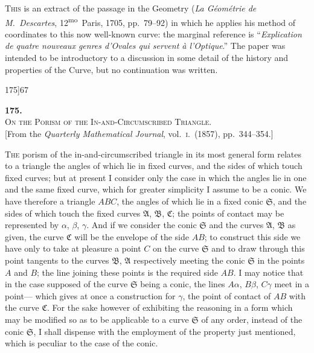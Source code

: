 \documentclass[11pt]{article}
\begin{document}
\bigskip

\textsc{This} is an extract of the passage in the Geometry (\textit{La G\'eom\'etrie de M.\ Descartes}, 12\textsuperscript{mo}\ Paris, 1705,
pp.~79--92) in which he applies his method of coordinates to this now well-known curve: the marginal
reference is ``\textit{Explication de quatre nouveaux genres d'Ovales qui servent \`a l'Optique}.'' The paper was intended
to be introductory to a discussion in some detail of the history and properties of the Curve, but no continuation was written.

\newpage

\begin{center}
\small 175]\hfill\hfill\textsc{67}
\end{center}

\vspace{4em}

\begin{center}
{\large\textbf{175.}}\\[1em]
{\large\scshape On the Porism of the In-and-Circumscribed Triangle.}\\[1em]
{\small [From the \textit{Quarterly Mathematical Journal}, vol.~\textsc{i}.\ (1857), pp.~344--354.]}
\end{center}

\bigskip

\textsc{The} porism of the in-and-circumscribed triangle in its most general form relates
to a triangle the angles of which lie in fixed curves, and the sides of which touch
fixed curves; but at present I consider only the case in which the angles lie in one
and the same fixed curve, which for greater simplicity I assume to be a conic. We
have therefore a triangle $ABC$, the angles of which lie in a fixed conic $\mathfrak{S}$, and the
sides of which touch the fixed curves $\mathfrak{A}$, $\mathfrak{B}$, $\mathfrak{C}$; the points of contact may be repre\-sented by $\alpha$, $\beta$, $\gamma$. And if we consider the conic $\mathfrak{S}$ and the curves $\mathfrak{A}$, $\mathfrak{B}$ as given,
the curve $\mathfrak{C}$ will be the envelope of the side $AB$; to construct this side we have
only to take at pleasure a point $C$ on the curve $\mathfrak{S}$ and to draw through this point
tangents to the curves $\mathfrak{B}$, $\mathfrak{A}$ respectively meeting the conic $\mathfrak{S}$ in the points $A$ and $B$;
the line joining these points is the required side $AB$. I may notice that in the
case supposed of the curve $\mathfrak{S}$ being a conic, the lines $A\alpha$, $B\beta$, $C\gamma$ meet in a point---
which gives at once a construction for $\gamma$, the point of contact of $AB$ with the curve $\mathfrak{C}$.
For the sake however of exhibiting the reasoning in a form which may be modified
so as to be applicable to a curve $\mathfrak{S}$ of any order, instead of the conic $\mathfrak{S}$, I shall
dispense with the employment of the property just mentioned, which is peculiar to
the case of the conic.
\end{document}
